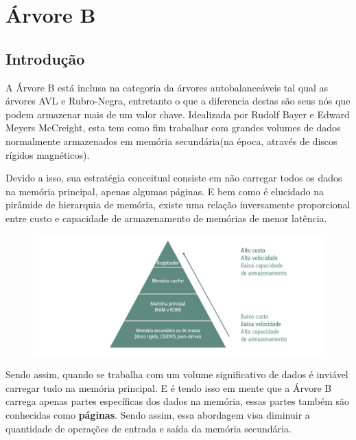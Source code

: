 \chapter{Árvore B}
\label{ch:heap} %

% 
\section*{Introdução}
A Árvore B está inclusa na categoria da árvores autobalanceáveis tal qual as árvores AVL e Rubro-Negra, entretanto o que a diferencia destas são seus nós que podem armazenar mais de um valor chave. Idealizada por Rudolf Bayer e Edward Meyers McCreight, esta tem como fim trabalhar com grandes volumes de dados normalmente armazenados em memória secundária(na época, através de discos rígidos magnéticos). 

Devido a isso, sua estratégia conceitual consiste em não carregar todos os dados na memória principal, apenas algumas páginas. E bem como é elucidado na pirâmide de hierarquia de memória, existe uma relação inversamente proporcional entre custo e capacidade de armazenamento de memórias de menor latência.

\begin{figure}[!ht]
	\centering
	\includegraphics[scale=0.7]{figures/piramide.png}
\end{figure}

Sendo assim, quando se trabalha com um volume significativo de dados é inviável carregar tudo na memória principal. E é tendo isso em mente que a Árvore B carrega apenas partes específicas dos dados na memória, essas partes também são conhecidas como \textbf{páginas}. Sendo assim, essa abordagem visa diminuir a quantidade de operações de entrada e saída da memória secundária.

